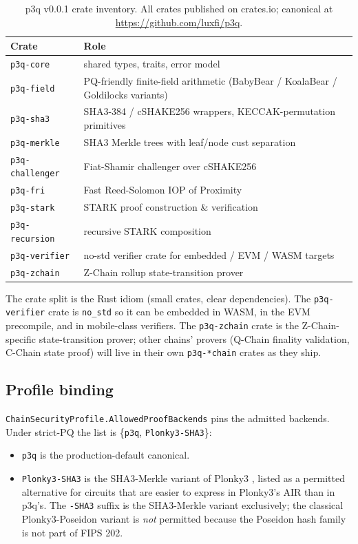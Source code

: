 \begin{table}[H]
\centering
\caption{p3q v0.0.1 crate inventory. All crates published on crates.io;
canonical at \url{https://github.com/luxfi/p3q}.}
\label{tab:p3q-crates}
\begin{tabular}{lp{8cm}}
\toprule
Crate & Role \\
\midrule
\texttt{p3q-core}        & shared types, traits, error model \\
\texttt{p3q-field}       & PQ-friendly finite-field arithmetic (BabyBear / KoalaBear / Goldilocks variants) \\
\texttt{p3q-sha3}        & SHA3-384 / cSHAKE256 wrappers, KECCAK-permutation primitives \\
\texttt{p3q-merkle}      & SHA3 Merkle trees with leaf/node cust separation \\
\texttt{p3q-challenger}  & Fiat-Shamir challenger over cSHAKE256 \\
\texttt{p3q-fri}         & Fast Reed-Solomon IOP of Proximity \\
\texttt{p3q-stark}       & STARK proof construction \& verification \\
\texttt{p3q-recursion}   & recursive STARK composition \\
\texttt{p3q-verifier}    & no-std verifier crate for embedded / EVM / WASM targets \\
\texttt{p3q-zchain}      & Z-Chain rollup state-transition prover \\
\bottomrule
\end{tabular}
\end{table}

The crate split is the Rust idiom (small crates, clear dependencies). The
\texttt{p3q-verifier} crate is \texttt{no\_std} so it can be embedded in
WASM, in the EVM precompile, and in mobile-class verifiers. The
\texttt{p3q-zchain} crate is the Z-Chain-specific state-transition prover;
other chains' provers (Q-Chain finality validation, C-Chain state proof)
will live in their own \texttt{p3q-*chain} crates as they ship.

\subsection{Profile binding}

\texttt{ChainSecurityProfile.AllowedProofBackends} pins the admitted backends.
Under strict-PQ the list is \{\texttt{p3q}, \texttt{Plonky3-SHA3}\}:

\begin{itemize}[leftmargin=2em,nosep]
  \item \texttt{p3q} is the production-default canonical.
  \item \texttt{Plonky3-SHA3} is the SHA3-Merkle variant of Plonky3
    \cite{plonky3}, listed as a permitted alternative for circuits that
    are easier to express in Plonky3's AIR than in p3q's. The
    \texttt{-SHA3} suffix is the SHA3-Merkle variant exclusively; the
    classical Plonky3-Poseidon variant is \emph{not} permitted because the
    Poseidon hash family is not part of FIPS 202.
\end{itemize}

